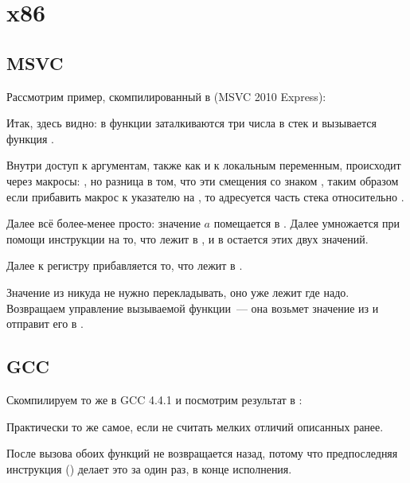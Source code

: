 \section{x86}

\subsection{MSVC}

Рассмотрим пример, скомпилированный в (MSVC 2010 Express):



Итак, здесь видно: в функции \main заталкиваются три числа в стек и вызывается функция .
 
Внутри \ttf доступ к аргументам, также как и к локальным переменным, происходит через макросы: 
, но разница в том, что эти смещения со знаком , 
таким образом если прибавить макрос  к указателю на \EBP, то адресуется  
часть  стека относительно \EBP.

Далее всё более-менее просто: значение $a$ помещается в \EAX. 
Далее \EAX умножается при помощи инструкции \IMUL на то, что лежит в , 
и в \EAX остается  этих двух значений.

Далее к регистру \EAX прибавляется то, что лежит в .

Значение из \EAX никуда не нужно перекладывать, оно уже лежит где надо. 
Возвращаем управление вызываемой функции~--- она возьмет значение из \EAX и отправит его в \printf.



\subsection{GCC}

Скомпилируем то же в GCC 4.4.1 и посмотрим результат в \IDA:



Практически то же самое, если не считать мелких отличий описанных ранее.

После вызова обоих функций  не возвращается назад, 
потому что предпоследняя инструкция  () делает это за один раз, в конце исполнения.

